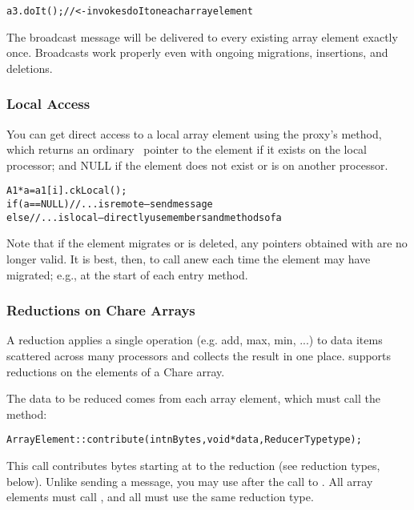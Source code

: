 \begin{alltt}
a3.doIt(); //<- invokes doIt on each array element
\end{alltt}

The broadcast message will be delivered to every existing array 
element exactly once.  Broadcasts work properly even with ongoing
migrations, insertions, and deletions.


\subsubsection{Local Access}
\experimental{}
You can get direct access to a local array element using the
proxy's  method, which returns an ordinary \CC\ pointer
to the element if it exists on the local processor; and NULL if
the element does not exist or is on another processor.

\begin{alltt}
A1 *a=a1[i].ckLocal();
if (a==NULL) //...is remote-- send message
else //...is local-- directly use members and methods of a
\end{alltt}

Note that if the element migrates or is deleted, any pointers 
obtained with  are no longer valid.  It is best,
then, to call  anew each time the element may have
migrated; e.g., at the start of each entry method.



\subsubsection{Reductions on Chare Arrays}
A reduction applies a single operation (e.g. add,
max, min, ...) to data items scattered across many processors and
collects the result in one place.  \charmpp{} supports reductions on the
elements of a Chare array.

The data to be reduced comes from each array element, 
which must call the  method:

\begin{alltt}
ArrayElement::contribute(int nBytes,void *data,ReducerType type);
\end{alltt}

This call contributes  bytes starting at  to the
reduction  (see reduction types, below).  Unlike sending a
message, you may use  after the call to .  All
array elements must call , and all must use the same
reduction type.  

